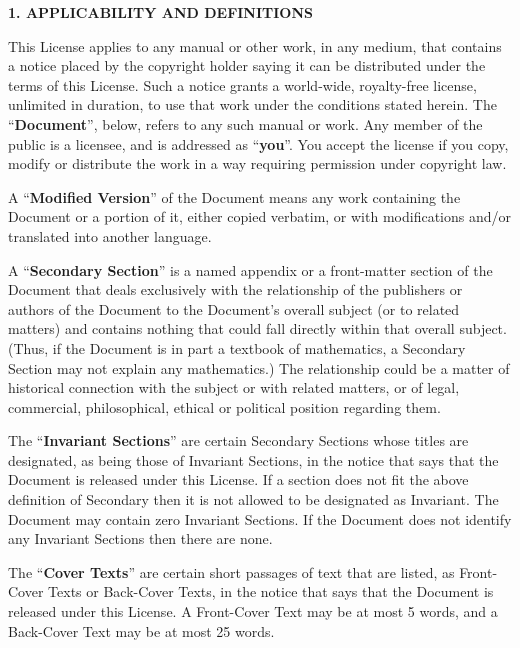 \documentclass[a4paper,spanish,12pt]{book}
\begin{document}
\begin{center}
{\Large\bf 1. APPLICABILITY AND DEFINITIONS\par}
\end{center}

This License applies to any manual or other work, in any medium, that
contains a notice placed by the copyright holder saying it can be
distributed under the terms of this License.  Such a notice grants a
world-wide, royalty-free license, unlimited in duration, to use that
work under the conditions stated herein.  The ``\textbf{Document}'', below,
refers to any such manual or work.  Any member of the public is a
licensee, and is addressed as ``\textbf{you}''.  You accept the license if you
copy, modify or distribute the work in a way requiring permission
under copyright law.

A ``\textbf{Modified Version}'' of the Document means any work containing the
Document or a portion of it, either copied verbatim, or with
modifications and/or translated into another language.

A ``\textbf{Secondary Section}'' is a named appendix or a front-matter section of
the Document that deals exclusively with the relationship of the
publishers or authors of the Document to the Document's overall subject
(or to related matters) and contains nothing that could fall directly
within that overall subject.  (Thus, if the Document is in part a
textbook of mathematics, a Secondary Section may not explain any
mathematics.)  The relationship could be a matter of historical
connection with the subject or with related matters, or of legal,
commercial, philosophical, ethical or political position regarding
them.

The ``\textbf{Invariant Sections}'' are certain Secondary Sections whose titles
are designated, as being those of Invariant Sections, in the notice
that says that the Document is released under this License.  If a
section does not fit the above definition of Secondary then it is not
allowed to be designated as Invariant.  The Document may contain zero
Invariant Sections.  If the Document does not identify any Invariant
Sections then there are none.

The ``\textbf{Cover Texts}'' are certain short passages of text that are listed,
as Front-Cover Texts or Back-Cover Texts, in the notice that says that
the Document is released under this License.  A Front-Cover Text may
be at most 5 words, and a Back-Cover Text may be at most 25 words.
\end{document}

